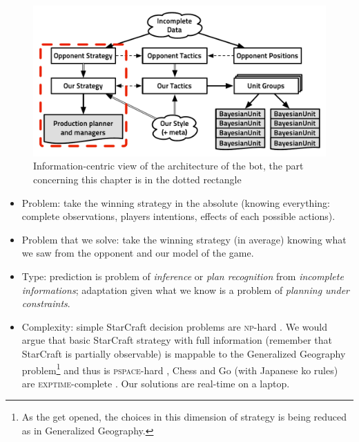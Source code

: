 

\begin{figure}[!ht]
\begin{center}
\includegraphics[width=1\columnwidth]{images/starcraft_bbq_concept_STRATEGY.pdf}
\end{center}
\caption{Information-centric view of the architecture of the bot, the part concerning this chapter is in the dotted rectangle}
\label{fig:conceptSTRATEGY}
\end{figure}

\begin{itemize}
\item Problem: take the winning strategy in the absolute (knowing everything: complete observations, players intentions, effects of each possible actions).
\item Problem that we solve: take the winning strategy (in average) knowing what we saw from the opponent and our model of the game. 
\item Type: prediction is problem of \textit{inference} or \textit{plan recognition} from \textit{incomplete informations}; adaptation given what we know is a problem of \textit{planning under constraints}.
\item Complexity: simple StarCraft decision problems are \textsc{np}-hard \citep{GamingComplexity}. We would argue that basic StarCraft strategy with full information (remember that StarCraft is partially observable) is mappable to the Generalized Geography problem\footnote{As the  get opened, the choices in this dimension of strategy is being reduced as in Generalized Geography.} and thus is \textsc{pspace}-hard \citep{Lichtenstein78},
Chess \citep{Fraenkel81} and Go (with Japanese ko rules) are \textsc{exptime}-complete \citep{Robson83}. Our solutions are real-time on a laptop. %
\end{itemize}

